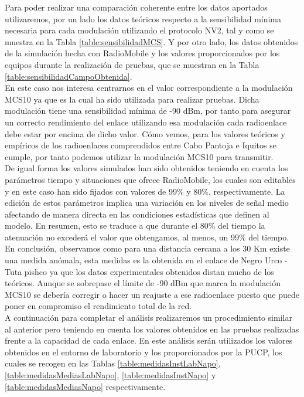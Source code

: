 Para poder realizar una comparación coherente entre los datos aportados utilizaremos, por un lado los datos teóricos respecto a la sensibilidad mínima necesaria para cada modulación utilizando el protocolo NV2, tal y como se muestra en la Tabla \ref{table:sensibilidadMCS}. Y por otro lado, los datos obtenidos de la simulación hecha con RadioMobile y los valores proporcionados por los equipos durante la realización de pruebas, que se muestran en la Tabla \ref{table:sensibilidadCampoObtenida}.\\
En este caso nos interesa centrarnos en el valor correspondiente a la modulación MCS10 ya que es la cual ha sido utilizada para realizar pruebas. Dicha modulación tiene una sensibilidad mínima de -90 dBm, por tanto para asegurar un correcto rendimiento del enlace utilizando esa modulación cada radioenlace debe estar por encima de dicho valor. Cómo vemos, para los valores teóricos y empíricos de los radioenlaces comprendidos entre Cabo Pantoja e Iquitos se cumple, por tanto podemos utilizar la modulación MCS10 para transmitir.\\

De igual forma los valores simulados han sido obtenidos teniendo en cuenta los parámetros tiempo y situaciones que ofrece RadioMobile, los cuales son editables y en este caso han sido fijados con valores de 99\% y 80\%, respectivamente. La edición de estos parámetros implica una variación en los niveles de señal medio afectando de manera directa en las condiciones estadísticas que definen al modelo. En resumen, esto se traduce a que durante el 80\% del tiempo la atenuación no excederá el valor que obtengamos, al menos, un 99\% del tiempo.\\

En conclusión, observamos como para una distancia cercana a los 30 Km existe una medida anómala, esta medidas es la obtenida en el enlace de Negro Urco - Tuta pishco ya que los datos experimentales obtenidos distan mucho de los teóricos. Aunque se sobrepase el límite de -90 dBm que marca la modulación MCS10 se debería corregir o hacer un reajuste a ese radioenlace puesto que puede poner en compromiso el rendimiento total de la red.\\

A continuación para completar el análisis realizaremos un procedimiento similar al anterior pero teniendo en cuenta los valores obtenidos en las pruebas realizadas frente a la capacidad de cada enlace. En este análisis serán utilizados los valores obtenidos en el entorno de laboratorio y los proporcionados por la PUCP, los cuales se recogen en las Tablas \ref{table:medidasInstLabNapo}, \ref{table:medidasMediasLabNapo}, \ref{table:medidasInstNapo} y \ref{table:medidasMediasNapo} respectivamente. \\

